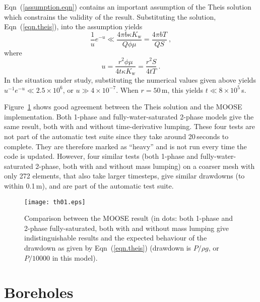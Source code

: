 \documentclass[]{scrreprt}
\begin{document}
Eqn~(\ref{assumption.eqn}) contains an important assumption of the
Theis solution which constrains the validity of the result.
Substituting the solution, Eqn~(\ref{eqn.theis}), into the assumption
yields
\begin{equation}
\frac{1}{u} e^{-u} \ll \frac{4 \pi b \kappa K_{\mathrm{w}}}{Q\phi\mu}
= \frac{4\pi b T}{QS} \ ,
\end{equation}
where
\begin{equation}
u = \frac{r^{2}\phi\mu}{4t\kappa K_{\mathrm{w}}} = \frac{r^{2}S}{4tT}
\ .
\end{equation}
In the situation under study, substituting the numerical values given
above yields $u^{-1}e^{-u} \ll 2.5\times 10^{6}$, or $u\gg 4\times
10^{-7}$.  When $r=50$\,m, this yields $t\ll 8\times 10^{5}$\,s.

Figure~\ref{th01.fig} shows good agreement between the Theis solution
and the MOOSE implementation.  Both 1-phase and fully-water-saturated
2-phase models give the same result, both with and without
time-derivative lumping.  These four tests are not part of the
automatic test suite since they take around 20\,seconds to complete.
They are therefore marked as ``heavy'' and is not run every time the
code is updated.  However, four similar tests (both 1-phase and
fully-water-saturated 2-phase, both with and without mass lumping) on
a coarser mesh with only 272 elements, that also take larger
timesteps, give similar drawdowns (to within 0.1\,m), and are part of
the automatic test suite.

\begin{figure}[htb]
\centering
\texttt{[image: th01.eps]}
\caption{Comparison between the MOOSE result (in dots: both 1-phase
  and 2-phase fully-saturated, both with and without mass lumping give
  indistinguishable results and the
  expected behaviour of the drawdown as given by Eqn~(\ref{eqn.theis})
  (drawdown is $P/\rho g$, or $P/10000$ in this model).}
\label{th01.fig}
\end{figure}


\chapter{Boreholes}
\label{bh}
\end{document}
